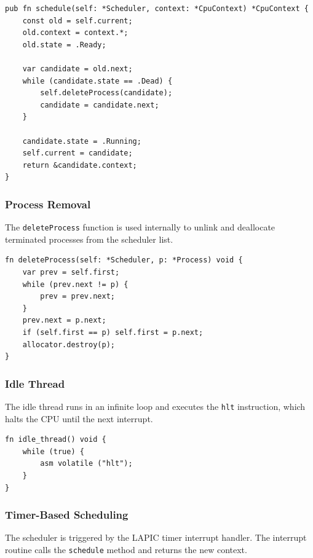 \documentclass[12pt]{extarticle}
\begin{document}
\begin{lstlisting}[language=zig, breaklines=true, basicstyle=\ttfamily\footnotesize]
pub fn schedule(self: *Scheduler, context: *CpuContext) *CpuContext {
    const old = self.current;
    old.context = context.*;
    old.state = .Ready;

    var candidate = old.next;
    while (candidate.state == .Dead) {
        self.deleteProcess(candidate);
        candidate = candidate.next;
    }

    candidate.state = .Running;
    self.current = candidate;
    return &candidate.context;
}
\end{lstlisting}

\subsubsection*{Process Removal}

The \texttt{deleteProcess} function is used internally to unlink and deallocate terminated processes from the scheduler list.

\begin{lstlisting}[language=zig, breaklines=true, basicstyle=\ttfamily\footnotesize]
fn deleteProcess(self: *Scheduler, p: *Process) void {
    var prev = self.first;
    while (prev.next != p) {
        prev = prev.next;
    }
    prev.next = p.next;
    if (self.first == p) self.first = p.next;
    allocator.destroy(p);
}
\end{lstlisting}

\subsubsection*{Idle Thread}

The idle thread runs in an infinite loop and executes the \texttt{hlt} instruction, which halts the CPU until the next interrupt.

\begin{lstlisting}[language=zig, breaklines=true, basicstyle=\ttfamily\footnotesize]
fn idle_thread() void {
    while (true) {
        asm volatile ("hlt");
    }
}
\end{lstlisting}

\subsubsection*{Timer-Based Scheduling}

The scheduler is triggered by the LAPIC timer interrupt handler. The interrupt routine calls the \texttt{schedule} method and returns the new context.
\end{document}
